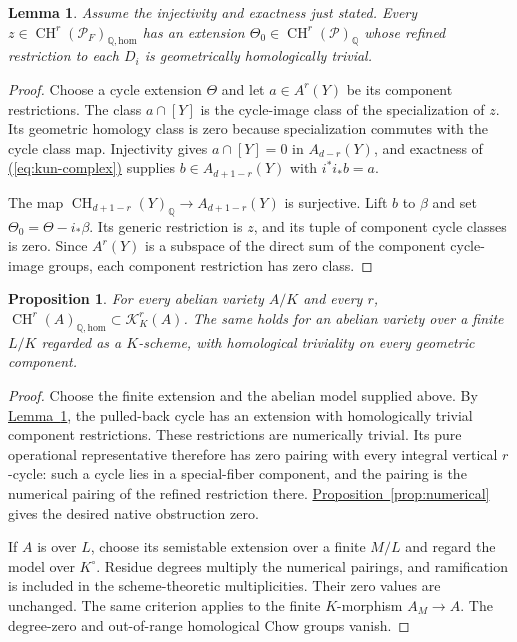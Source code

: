 \documentclass[11pt,a4paper]{article}
\newtheorem{proposition}[theorem]{Proposition}
\newtheorem{lemma}[theorem]{Lemma}
\theoremstyle{definition}
\theoremstyle{remark}\newtheorem{remark}[theorem]{Remark}
\numberwithin{equation}{section}
\newcommand{\Q}{\mathbb Q}\newcommand{\R}{\mathbb R}\newcommand{\C}{\mathbb C}
\newcommand{\CH}{\operatorname{CH}}\newcommand{\an}{\mathrm{an}}
\newcommand{\homol}{\mathrm{hom}}\newcommand{\BC}{\mathrm{BC}}
\newcommand{\propref}[1]{\hyperref[#1]{\textcolor{resultlink}{Proposition~\ref*{#1}}}}
\newcommand{\lemref}[1]{\hyperref[#1]{\textcolor{resultlink}{Lemma~\ref*{#1}}}}
\renewcommand{\eqref}[1]{\hyperref[#1]{\textcolor{equationlink}{(\ref*{#1})}}}
\begin{document}
\begin{lemma}\label{lem:model-correction}
Assume the injectivity and exactness just stated. Every
$z\in\CH^r(\mathcal P_F)_{\Q,\homol}$ has an extension
$\Theta_0\in\CH^r(\mathcal P)_\Q$ whose refined restriction to
each $D_i$ is geometrically homologically trivial.
\end{lemma}

\begin{proof}
Choose a cycle extension $\Theta$ and let $a\in A^r(Y)$ be its
component restrictions. The class $a\cap[Y]$ is the cycle-image class
of the specialization of $z$. Its geometric homology class is zero
because specialization commutes with the cycle class map. Injectivity
gives $a\cap[Y]=0$ in $A_{d-r}(Y)$, and exactness of
\eqref{eq:kun-complex} supplies $b\in A_{d+1-r}(Y)$ with
$i^*i_*b=a$.

The map $\CH_{d+1-r}(Y)_\Q\to A_{d+1-r}(Y)$ is surjective.
Lift $b$ to $\beta$ and set $\Theta_0=\Theta-i_*\beta$. Its generic
restriction is $z$, and its tuple of component cycle classes is zero.
Since $A^r(Y)$ is a subspace of the direct sum of the component
cycle-image groups, each component restriction has zero class.
\end{proof}

\begin{proposition}\label{prop:abelian-zero}
For every abelian variety $A/K$ and every $r$,
$\CH^r(A)_{\Q,\homol}\subset\mathcal K_K^r(A)$. The same
holds for an abelian variety over a finite $L/K$ regarded as a
$K$-scheme, with homological triviality on every geometric component.
\end{proposition}

\begin{proof}
Choose the finite extension and the abelian model supplied above.
By \lemref{lem:model-correction}, the pulled-back cycle has an
extension with homologically trivial component restrictions. These
restrictions are numerically trivial. Its pure operational
representative therefore has zero pairing with every integral
vertical $r$-cycle: such a cycle lies in a special-fiber component,
and the pairing is the numerical pairing of the refined restriction
there. \propref{prop:numerical} gives the desired native obstruction
zero.

If $A$ is over $L$, choose its semistable extension over a finite
$M/L$ and regard the model over $K^\circ$. Residue degrees multiply
the numerical pairings, and ramification is included in the
scheme-theoretic multiplicities. Their zero values are unchanged.
The same criterion applies to the finite $K$-morphism $A_M\to A$.
The degree-zero and out-of-range homological Chow groups vanish.
\end{proof}
\end{document}
